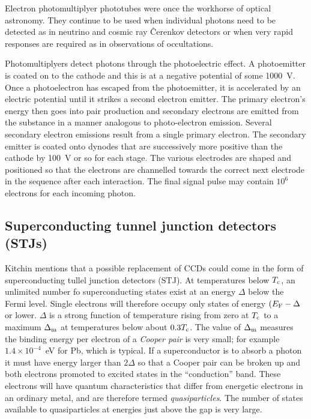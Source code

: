 Electron photomultiplyer phototubes were once the workhorse of optical 
astronomy. They continue to be used when individual photons need to be
detected  as in neutrino and cosmic ray \^Cerenkov detectors or when very
rapid responses are required as in observations of occultations.

Photomultiplyers detect photons through the photoelectric effect. A 
photoemitter is coated on to the cathode and this is at a negative potential
of some 1000~V. Once a photoelectron has escaped from the photoemitter, it
is accelerated by an electric potential until it strikes a second 
electron emitter. The primary electron's energy then goes into pair production
and secondary electrons are emitted from the substance in a manner analogous
to photo-electron emission. Several secondary electron emissions result 
from a single primary electron. The secondary emitter is coated onto dynodes
that are successively more positive than the cathode by 100~V or so for each
stage. The various electrodes are shaped and positioned so that the electrons
are channelled towards the correct next electrode in the sequence after 
each interaction. The final signal pulse may contain $10^6$ electrons for each
incoming photon. 

\subsection{Superconducting tunnel junction detectors (STJs)}

Kitchin mentions that a possible replacement of CCDs could come in the form
of superconducting tullel junction detectors (STJ). At temperatures
below $T_{\rm c}$, an unlimited number fo superconducting states exist
at an energy $\Delta$ below the Fermi level. Single electrons will
therefore occupy only states of energy $(E_{\rm F}-\Delta$ or
  lower. $\Delta$ is a strong function of temperature rising from zero
  at $T_{\rm c}$ to a maximum $\Delta_{\rm m}$ at temperatures below
  about $0.3T_{\rm c}$. The value of $\Delta_{\rm m}$ measures the
  binding energy per electron of a {\it Cooper pair} is very small;
  for example $1.4\times 10^{-4}$~eV for Pb, which is typical. If a
  superconductor is to absorb a photon it must have energy larger than
  $2\Delta$ so that a Cooper pair can be broken up and both electrons
  promoted to excited states in the ``conduction'' band. These
  electrons will have quantum characteristics that differ from
  energetic electrons in an ordinary metal, and are therefore termed
  {\it quasiparticles}. The number of states available to
  quasiparticles at energies just above the gap is very large.

